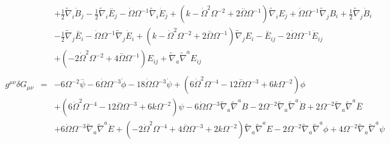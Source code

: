 \documentclass[10pt,letterpaper]{article}
\numberwithin{equation}{section}
\begin{document}
\begin{eqnarray}
&& + \tfrac{1}{2} \tilde{\nabla}_{i}\dot{B}_{j} -  \tfrac{1}{2} \tilde{\nabla}_{i}\overset{..}{E}_{j} -  \dot{\Omega} \Omega^{-1} \tilde{\nabla}_{i}\dot{E}_{j} + (k -  \dot{\Omega}^2 \Omega^{-2} + 2 \overset{..}{\Omega} \Omega^{-1}) \tilde{\nabla}_{i}E_{j} + \dot{\Omega} \Omega^{-1} \tilde{\nabla}_{j}B_{i} + \tfrac{1}{2} \tilde{\nabla}_{j}\dot{B}_{i} \nonumber \\ 
&& -  \tfrac{1}{2} \tilde{\nabla}_{j}\overset{..}{E}_{i} -  \dot{\Omega} \Omega^{-1} \tilde{\nabla}_{j}\dot{E}_{i} + (k -  \dot{\Omega}^2 \Omega^{-2} + 2 \overset{..}{\Omega} \Omega^{-1}) \tilde{\nabla}_{j}E_{i}- \overset{..}{E}_{ij} - 2 \dot{\Omega} \Omega^{-1} \dot{E}_{ij} \nonumber \\ 
&& + (-2 \dot{\Omega}^2 \Omega^{-2} + 4 \overset{..}{\Omega} \Omega^{-1}) E_{ij} + \tilde{\nabla}_{a}\tilde{\nabla}^{a}E_{ij}
\\  \nonumber\\ 
g^{\mu\nu}\delta G_{\mu\nu}&=& -6 \Omega^{-2} \overset{..}{\psi} - 6 \dot{\Omega} \Omega^{-3} \dot{\phi} - 18 \dot{\Omega} \Omega^{-3} \dot{\psi} + (6 \dot{\Omega}^2 \Omega^{-4} - 12 \overset{..}{\Omega} \Omega^{-3} + 6 k \Omega^{-2}) \phi \nonumber \\ 
&& + (6 \dot{\Omega}^2 \Omega^{-4} - 12 \overset{..}{\Omega} \Omega^{-3} + 6 k \Omega^{-2}) \psi - 6 \dot{\Omega} \Omega^{-3} \tilde{\nabla}_{a}\tilde{\nabla}^{a}B - 2 \Omega^{-2} \tilde{\nabla}_{a}\tilde{\nabla}^{a}\dot{B} + 2 \Omega^{-2} \tilde{\nabla}_{a}\tilde{\nabla}^{a}\overset{..}{E} \nonumber \\ 
&& + 6 \dot{\Omega} \Omega^{-3} \tilde{\nabla}_{a}\tilde{\nabla}^{a}\dot{E} + (-2 \dot{\Omega}^2 \Omega^{-4} + 4 \overset{..}{\Omega} \Omega^{-3} + 2 k \Omega^{-2}) \tilde{\nabla}_{a}\tilde{\nabla}^{a}E - 2 \Omega^{-2} \tilde{\nabla}_{a}\tilde{\nabla}^{a}\phi + 4 \Omega^{-2} \tilde{\nabla}_{a}\tilde{\nabla}^{a}\psi 
\end{eqnarray}

\end{document}
